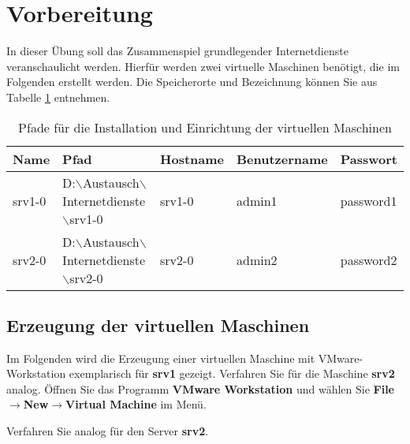 
\section{Vorbereitung}
In dieser Übung soll das Zusammenspiel grundlegender Internetdienste veranschaulicht werden.
Hierfür werden zwei virtuelle Maschinen benötigt, die im Folgenden erstellt
werden. Die Speicherorte und Bezeichnung können Sie aus Tabelle
\ref{tab:install-location} entnehmen.

\scriptsize
\begin{table}[!h]
  \centering
	\begin{tabular}{l l l l l}
		\hline
		Name & Pfad & Hostname & Benutzername & Passwort \\
		\hline
		srv1-0 & D:$\backslash$Austausch$\backslash$Internetdienste$\backslash$srv1-0 &
		srv1-0 & admin1 & password1 \\
		srv2-0 & D:$\backslash$Austausch$\backslash$Internetdienste$\backslash$srv2-0 &
		srv2-0 & admin2 & password2 \\
		\hline
	\end{tabular}
	\caption{Pfade für die Installation und Einrichtung der virtuellen Maschinen}
	\label{tab:install-location}
\end{table}
\normalsize 

\subsection{Erzeugung der virtuellen Maschinen}
Im Folgenden wird die Erzeugung einer virtuellen Maschine mit VMware-Workstation exemplarisch für \textbf{srv1} gezeigt. Verfahren Sie für die Maschine \textbf{srv2} analog.
Öffnen Sie das Programm  \textbf{VMware Workstation} und wählen Sie \textbf{File$\rightarrow$New$\rightarrow$Virtual Machine} im Menü.

Verfahren Sie analog für den Server \textbf{srv2}.